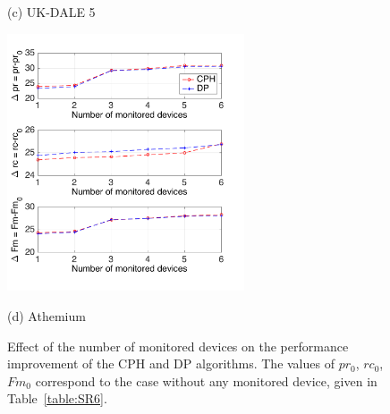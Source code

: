 \begin{figure}[htb]
\begin{minipage}[b]{.48\linewidth}
  \centerline{(c) UK-DALE 5}\medskip
\end{minipage}
\hfill
\begin{minipage}[b]{0.48\linewidth}
  \centering
  \centerline{\includegraphics[width=7cm]{./chapters/chapter5/images/A_kp_nmodev.pdf}}
  \centerline{(d) Athemium}\medskip
\end{minipage}
\caption{Effect of the number of monitored devices on the performance improvement of the CPH and DP algorithms. The values of $pr_0$, $rc_0$, $Fm_0$ correspond to the case without any monitored device, given in Table~\ref{table:SR6}.}
\label{fig:SR2}
%
\end{figure}

